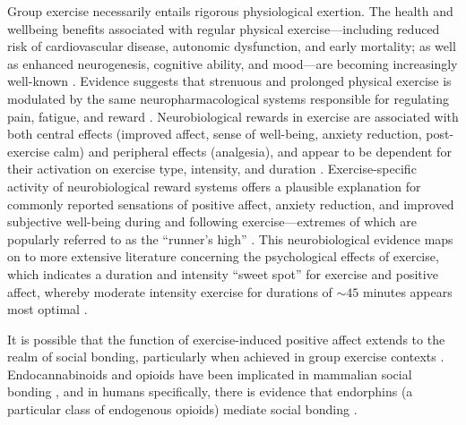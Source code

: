 \begin{CJK}{UTF8}{gbsn}
Group exercise necessarily entails rigorous physiological exertion.
The health and wellbeing benefits associated with regular physical exercise---including reduced risk of cardiovascular disease, autonomic dysfunction, and early mortality; as well as enhanced neurogenesis, cognitive ability, and mood---are becoming increasingly well-known \citep{Blair1994,Nagamatsu2014}. Evidence suggests that strenuous and prolonged physical exercise is modulated by the same neuropharmacological systems responsible for regulating pain, fatigue, and reward \citep{Boecker2008,Raichlen2013}.  Neurobiological rewards in exercise are associated with both central effects (improved affect, sense of well-being, anxiety reduction, post-exercise calm) and peripheral effects (analgesia), and appear to be dependent for their activation on exercise type, intensity, and duration \citep{Dietrich2004}.  Exercise-specific activity of neurobiological reward systems offers a plausible explanation for commonly reported sensations of positive affect, anxiety reduction, and improved subjective well-being during and following exercise---extremes of which are popularly referred to as the ``runner's high'' \citep{Dietrich2004,Boecker2008,Raichlen2012}.  This neurobiological evidence maps on to more extensive literature concerning the psychological effects of exercise, which indicates a duration and intensity ``sweet spot'' for exercise and positive affect, whereby moderate intensity exercise for durations of $\sim45$ minutes appears most optimal \citep{Reed2006}.

It is possible that the function of exercise-induced positive affect extends to the realm of social bonding, particularly when achieved in group exercise contexts \citep{Cohen2009,Machin2011}.  Endocannabinoids and opioids have been implicated in mammalian social bonding \citep{Fattore2010,Keverne1989}, and in humans specifically, there is evidence that endorphins (a particular class of endogenous opioids) mediate social bonding \citep{Dunbar2012,Shultz2010}.


\end{CJK}
